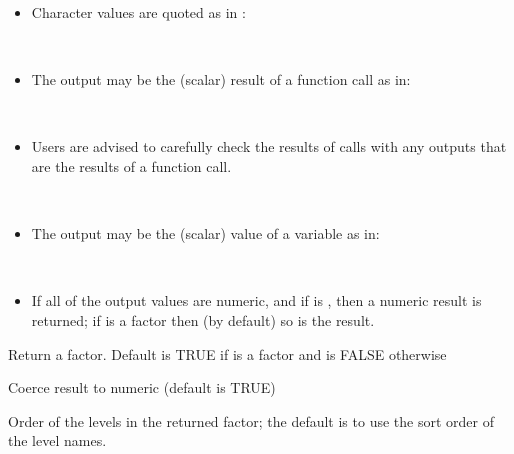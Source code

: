 \documentclass[a4paper]{book}
\begin{document}
\begin{Arguments}
\begin{ldescription}
\begin{itemize}

\\{}
\item Character values are quoted as in :


\\{}
\item The output may be the (scalar) result of a function call as in:


\\{}
\item Users are advised to carefully check the results of  calls
with any outputs that are the results of a function call.

\\{}
\item The output may be the (scalar) value of a variable as in:


\\{}
\item If all of the output values are numeric, and if  is ,
then a numeric result is returned; if  is a factor then
(by default) so is the result.

\end{itemize}


\item[\code{afr}] Return a factor. Default is TRUE if  is a factor and is
FALSE otherwise

\item[\code{anr}] Coerce result to numeric (default is TRUE)

\item[\code{levels}] Order of the levels in the returned factor; the default is to use
the sort order of the level names.
\end{ldescription}
\end{Arguments}
\end{document}
